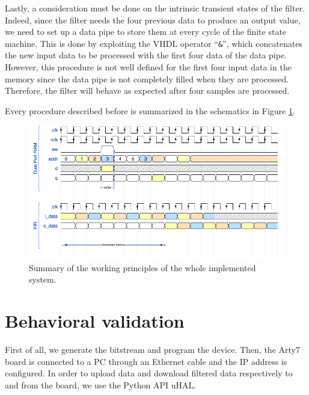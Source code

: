 \documentclass[11pt, a4paper]{article}
\begin{document}

Lastly, a consideration must be done on the intrinsic transient states of the filter. Indeed, since the filter needs the four previous data to produce an output value, we need to set up a data pipe to store them at every cycle of the finite state machine. This is done by exploiting the VHDL operator ``{\footnotesize\texttt{\&}}'', which concatenates the new input data to be processed with the first four data of the data pipe. However, this procedure is not well defined for the first four input data in the memory since the data pipe is not completely filled when they are processed. Therefore, the filter will behave as expected after four samples are processed.

Every procedure described before is summarized in the schematics in Figure \ref{fig:wavedrom}.
\clearpage
\begin{figure}[h!]
    \centering
    \includegraphics[width=1.0\textwidth]{../images/implementation/wavedrom.png}
    \caption{Summary of the working principles of the whole implemented system.}
    \label{fig:wavedrom}
\end{figure}





\section{Behavioral validation}
First of all, we generate the bitstream and program the device. Then, the Arty7 board is connected to a PC through an Ethernet cable and the IP address is configured. In order to upload data and download filtered data respectively to and from the board, we use the Python API uHAL. 
\end{document}
